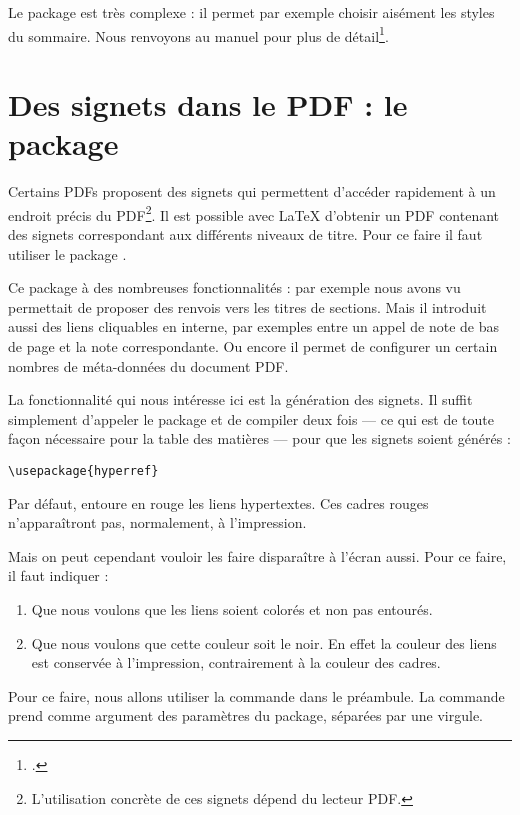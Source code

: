 Le package  est très complexe : il permet par exemple choisir aisément les styles du sommaire. Nous renvoyons au manuel pour plus de détail\footcites{minitoc}[en particulier][]{minitoc_typesetting}.

\section{Des signets dans le PDF : le package }\label{hyperref}

Certains PDFs proposent des signets qui permettent d'accéder rapidement à un endroit précis du PDF\footnote{L'utilisation concrète de ces signets dépend du lecteur PDF.}. Il est possible avec \LaTeX{} d'obtenir un PDF contenant des signets correspondant aux différents niveaux de titre. Pour ce faire il faut utiliser le package .

Ce package à des nombreuses fonctionnalités : par exemple nous avons vu  permettait de proposer des renvois vers les titres de sections.
Mais il introduit aussi des liens cliquables en interne, par exemples entre un appel de note de bas de page et la note correspondante. Ou encore il permet de configurer un certain nombres de méta-données du document PDF.

La fonctionnalité qui nous intéresse ici est la génération des signets. Il suffit simplement d'appeler le package et de compiler deux fois --- ce qui est de toute façon nécessaire pour la table des matières --- pour que les signets soient générés :

\begin{verbatim}
\usepackage{hyperref}
\end{verbatim}

Par défaut,  entoure en rouge les liens hypertextes. Ces cadres rouges n'apparaîtront pas, normalement, à l'impression.

Mais on peut cependant vouloir les faire disparaître à l'écran aussi. Pour ce faire, il faut indiquer :
\begin{enumerate}
\item Que nous voulons que les liens soient colorés et non pas entourés.
\item Que nous voulons que cette couleur soit le noir. En effet la couleur des liens est conservée à l'impression, contrairement à la couleur des cadres.
\end{enumerate}

Pour ce faire, nous allons utiliser la commande  dans le préambule. La commande prend comme argument des paramètres du package, séparées par une virgule.

